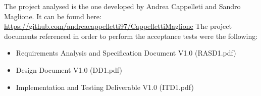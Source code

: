 The project analysed is the one developed by Andrea Cappelleti and Sandro Maglione. It can be found here: \url{https://github.com/andreacappelletti97/CappellettiMaglione}
The project documents referenced in order to perform the acceptance tests were the following:
\begin{itemize}
    \item 
    Requirements Analysis and Specification Document V1.0 (RASD1.pdf)
    \item
    Design Document V1.0 (DD1.pdf)
    \item
    Implementation and Testing Deliverable V1.0 (ITD1.pdf) 
\end{itemize}

